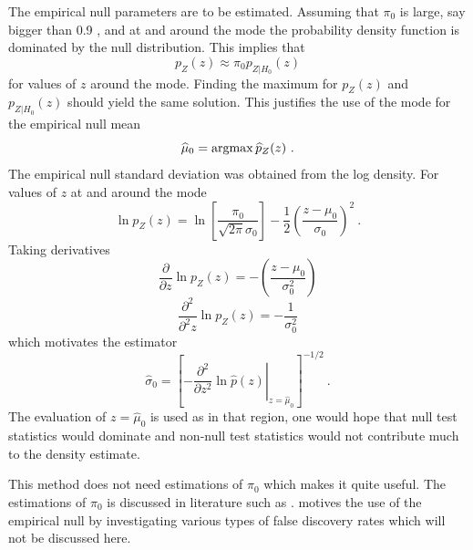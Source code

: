 The empirical null parameters are to be estimated. Assuming that $\pi_0$ is large, say bigger than 0.9 \citep{efron2004large}, and at and around the mode the probability density function is dominated by the null distribution. This implies that
\begin{equation}
	p_{Z}(z) \approx \pi_0 p_{Z|H_0}(z)
\end{equation}
for values of $z$ around the mode. Finding the maximum for $p_{Z}(z)$ and $p_{Z|H_0}(z)$ should yield the same solution. This justifies the use of the mode for the empirical null mean \citep{efron2004large}
\begin{equation}
	\widehat{\mu}_0 = \argmax\widehat{p}_Z(z) \ .
\end{equation} 
The empirical null standard deviation was obtained from the log density. For values of $z$ at and around the mode
\begin{equation}
	\ln p_{Z}(z) = 
	\ln\left[
		\dfrac{\pi_0}{\sqrt{2\pi}{\sigma}_0}
	\right]
	-\dfrac{1}{2}
	\left(
		\dfrac{z-{\mu}_0}{{\sigma}_0}
	\right)^2
	\ .
\end{equation}
Taking derivatives
\begin{equation}
	\dfrac{\partial}{\partial z} \ln p_{Z}(z) =
	-\left(
		\dfrac{
			z-{\mu}_0
		}
		{
			{\sigma}_0^2
		}
	\right)
\end{equation}
\begin{equation}
	\dfrac{\partial^2}{\partial^2 z} \ln p_{Z}(z) =
	-\dfrac{
		1
	}
	{
		{\sigma}_0^2
	}
\end{equation}
which motivates the estimator \citep{efron2004large}
\begin{equation}
	\widehat{\sigma}_0 = \left[
		\left.
			-\dfrac{\partial^2}{\partial z^2}\ln\widehat{p}(z)
		\right|_{z=\widehat{\mu}_0}
	\right]^{-1/2}
	\ .
\end{equation}
The evaluation of $z=\widehat{\mu}_0$ is used as in that region, one would hope that null test statistics would dominate and non-null test statistics would not contribute much to the density estimate.

This method does not need estimations of $\pi_0$ which makes it quite useful. The estimations of $\pi_0$ is discussed in literature such as \cite{benjamini2000adaptive, pounds2003estimating, storey2003statistical, pounds2004improving, langaas2005estimating, durnez2014posthoc}. \cite{efron2004large} motives the use of the empirical null by investigating various types of false discovery rates \citep{storey2002direct, storey2003positive, efron2002empirical, efron2007size} which will not be discussed here.

